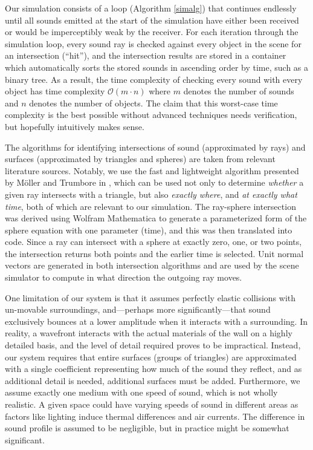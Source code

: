 \documentclass[10pt]{article}
\begin{document}
Our simulation consists of a loop (Algorithm \ref{simalg}) that continues
endlessly until all sounds emitted at the start of the simulation have either
been received or would be imperceptibly weak by the receiver.  For each
iteration through the simulation loop, every sound ray is checked against every
object in the scene for an intersection (``hit''), and the intersection results
are stored in a container which automatically sorts the stored sounds in
ascending order by time, such as a binary tree.  As a result, the time
complexity of checking every sound with every object has time complexity
$\mathcal{O}(m \cdot n)$ where $m$ denotes the number of sounds and $n$ denotes
the number of objects.  The claim that this worst-case time complexity is the
best possible without advanced techniques needs verification, but hopefully
intuitively makes sense.

The algorithms for identifying intersections of sound (approximated by rays) and
surfaces (approximated by triangles and spheres) are taken from relevant
literature sources.  Notably, we use the fast and lightweight algorithm
presented by M\"oller and Trumbore in \cite{raytrialgo}, which can be used not
only to determine \emph{whether} a given ray intersects with a triangle, but
also \emph{exactly where}, and \emph{at exactly what time}, both of which are
relevant to our simulation.  The ray-sphere intersection was derived using
Wolfram Mathematica to generate a parameterized form of the sphere equation with
one parameter (time), and this was then translated into code.  Since a ray can
intersect with a sphere at exactly zero, one, or two points, the intersection
returns both points and the earlier time is selected.  Unit normal vectors are
generated in both intersection algorithms and are used by the scene simulator to
compute in what direction the outgoing ray moves.

One limitation of our system is that it assumes perfectly elastic collisions
with un-movable surroundings, and---perhaps more significantly---that sound
exclusively bounces at a lower amplitude when it interacts with a surrounding.
In reality, a wavefront interacts with the actual materials of the wall on a
highly detailed basis, and the level of detail required proves to be
impractical.  Instead, our system requires that entire surfaces (groups of
triangles) are approximated with a single coefficient representing how much of
the sound they reflect, and as additional detail is needed, additional surfaces
must be added.  Furthermore, we assume exactly one medium with one speed of
sound, which is not wholly realistic.  A given space could have varying speeds
of sound in different areas as factors like lighting induce thermal differences
and air currents.  The difference in sound profile is assumed to be negligible,
but in practice might be somewhat significant.
\end{document}
